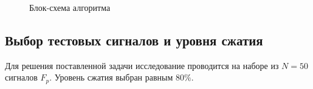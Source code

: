 \documentclass[11pt, oneside, a4paper]{article}
\begin{document}
\begin{figure}[h]
	\caption{Блок-схема алгоритма}
	\label{block-diagram}
\end{figure}

\subsection{Выбор тестовых сигналов и уровня сжатия}
Для решения поставленной задачи исследование проводится на наборе из $N=50$ сигналов $F_p$. Уровень сжатия выбран равным $80\%$. 
\end{document}
